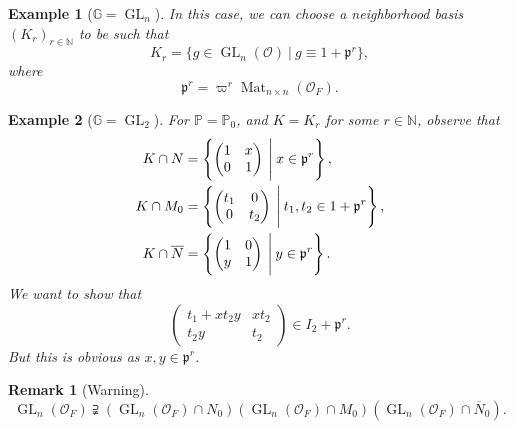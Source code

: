 \documentclass[8pt]{article}
\newtheorem{remark}{Remark}[section]
\newtheorem{example}{Example}[section]
\DeclareMathOperator{\GL}{GL}
\DeclareMathOperator{\Mat}{Mat}
\newcommand{\N}[0]{\mathbb{N}}
\newcommand{\G}[0]{\mathbb{G}}
\newcommand{\Para}[0]{\mathbb{P}}
\newcommand{\sep}[0]{\:|\:}
\begin{document}
\begin{example}[$\G=\GL_n$]
  In this case, we can choose a neighborhood basis $(K_r)_{r\in\N}$ to be such that 
  \begin{equation*}
    K_r = \{g\in\GL_n(\mathcal{O})\sep g\equiv 1+\mathfrak{p}^r\},
  \end{equation*}
  where 
  \begin{equation*}
    \mathfrak{p}^r = \varpi^r\Mat_{n\times n}(\mathcal{O}_F).
  \end{equation*}
\end{example}


\begin{example}[$\G=\GL_2$]
  For $\Para = \Para_0$, and $K=K_r$ for some $r\in\N$, observe that 
  \begin{align*}
    K\cap N &= \left\{\begin{pmatrix}
      1 & x\\
      0& 1
    \end{pmatrix}
    \:\Bigg{|}\: x\in\mathfrak{p}^r\right\},\\
    K\cap M_0 & = \left\{\begin{pmatrix}
      t_1 & 0\\
      0& t_2
    \end{pmatrix}
    \:\Bigg{|}\: t_1,t_2\in1+\mathfrak{p}^r\right\},\\
    K\cap \overline{N} &= \left\{\begin{pmatrix}
      1 & 0\\
      y& 1
    \end{pmatrix}
    \:\Bigg{|}\: y\in\mathfrak{p}^r\right\}.
  \end{align*}
  We want to show that 
  \begin{equation*}
    \begin{pmatrix}
      t_1+xt_2y & xt_2\\
      t_2y & t_2
    \end{pmatrix}
    \in I_2+\mathfrak{p}^r.
  \end{equation*}
  But this is obvious as $x,y\in\mathfrak{p}^r$.
\end{example}

\begin{remark}[Warning]
  \begin{equation*}
    \GL_n(\mathcal{O}_F)\supsetneqq (\GL_n(\mathcal{O}_F)\cap N_0)(\GL_n(\mathcal{O}_F)\cap M_0)(\GL_n(\mathcal{O}_F)\cap \overline{N}_0).
  \end{equation*}
\end{remark}
\end{document}
